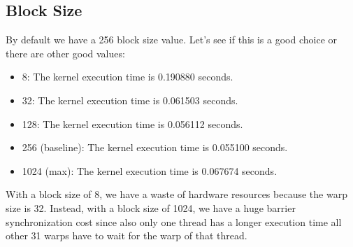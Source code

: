 \subsection{Block Size}
By default we have a 256 block size value. Let's see if this is a good choice or there are other good values:
\begin{itemize}
    \item 8: The kernel execution time is 0.190880 seconds.
    \item 32: The kernel execution time is 0.061503 seconds.
    \item 128: The kernel execution time is 0.056112 seconds.
    \item 256 (baseline): The kernel execution time is 0.055100 seconds.
    \item 1024 (max): The kernel execution time is 0.067674 seconds.
\end{itemize}

With a block size of 8, we have a waste of hardware resources because the warp size is 32. Instead, with a block size of 1024, we have a huge barrier synchronization cost since also only one thread has a longer execution time all other 31 warps have to wait for the warp of that thread.